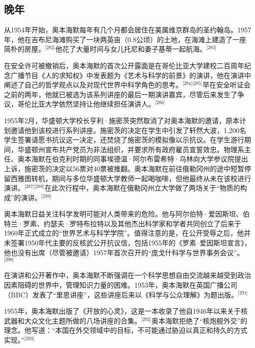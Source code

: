 \subsection{晚年}
从1954年开始，奥本海默每年有几个月都会居住在美属维京群岛的圣约翰岛。1957年，他在吉布尼海滩购买了一块两英亩（0.8公顷）的土地，在海滩上建造了一座简朴的房屋。\(^\text{[282]}\)他花了大量时间与女儿托尼和妻子基蒂一起航海。\(^\text{[283]}\)

在安全许可被撤销后，奥本海默的首次公开露面是在哥伦比亚大学建校二百周年纪念广播节目《人的求知权》中发表题为《艺术与科学的前景》的演讲，他在演讲中阐述了自己的哲学观点以及对现代世界中科学角色的思考。\(^\text{[284][285]}\)早在安全听证会之前的两年，他就已被选为该系列讲座的最后一期演讲嘉宾，尽管后来发生了争议，哥伦比亚大学依然坚持让他继续担任演讲人。\(^\text{[286]}\)

1955年2月，华盛顿大学校长亨利·施密茨突然取消了对奥本海默的邀请，原本计划邀请他到该校进行系列讲座。施密茨的决定在学生中引发了轩然大波，1,200名学生签署请愿书抗议这一决定，还焚烧了施密茨的模拟像以示抗议。在学生游行期间，华盛顿州宣布共产党员为非法组织，并要求所有政府雇员宣誓效忠。物理系主任、奥本海默在伯克利时期的同事埃德温·阿尔布雷希特·乌林向大学参议院提出上诉，施密茨的决定以56票对40票被推翻。奥本海默在前往俄勒冈州的途中短暂停留西雅图转机，期间与多位华盛顿大学教师一起喝咖啡，但他最终从未在该校进行演讲。\(^\text{[287][288]}\)在此次行程中，奥本海默在俄勒冈州立大学做了两场关于“物质的构成”的演讲。\(^\text{[289]}\)

奥本海默日益关注科学发明可能对人类带来的危险。他与阿尔伯特·爱因斯坦、伯特兰·罗素、约瑟夫·罗特布拉特以及其他杰出科学家和学者共同创立了后来于1960年正式成立的“世界艺术与科学学院”。值得注意的是，在公开受辱之后，他并未签署1950年代主要的反核武公开抗议信，包括1955年的《罗素–爱因斯坦宣言》，他也没有出席（尽管被邀请）1957年首次召开的“庞戈什科学与世界事务会议”。\(^\text{[290]}\)

在演讲和公开著作中，奥本海默不断强调在一个科学思想自由交流越来越受到政治因素阻碍的世界中，管理知识力量的困难。1953年，奥本海默在英国广播公司（BBC）发表了“里思讲座”，这些讲座后来以《科学与公众理解》为题出版。\(^\text{[291]}\)

1955年，奥本海默出版了《开放的心灵》，这是一本收录了他自1946年以来关于核武器和大众文化主题所做的八场讲座的合集。\(^\text{[292]}\)奥本海默拒绝了“核炮舰外交”的理念。他写道：“本国在外交领域中的目标，不可能通过胁迫以真正和持久的方式实现。”\(^\text{[293]}\)


